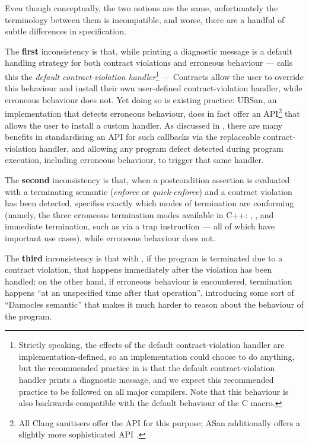Even though conceptually, the two notions are the same, unfortunately the terminology between them is incompatible, and worse, there are a handful of subtle differences in specification. 

The \textbf{first} inconsistency is that, while printing a diagnostic message is a default handling strategy for both contract violations and erroneous behaviour --- \cite{P2900R13} calls this the \emph{default contract-violation handler}\footnote{Strictly speaking, the effects of the default contract-violation handler are implementation-defined, so an implementation could choose to do anything, but the recommended practice in \cite{P2900R13} is that the default contract-violation handler prints a diagnostic message, and we expect this recommended practice to be followed on all major compilers. Note that this behaviour is also backwards-compatible with the default behaviour of the C  macro.}  --- Contracts allow the user to override this behaviour and install their own user-defined contract-violation handler, while erroneous behaviour does not. Yet doing so is existing practice: UBSan, an implementation that detects erroneous behaviour, does in fact offer an API\footnote{All Clang sanitisers offer the API  for this purpose; ASan additionally offers a slightly more sophisticated API .} that allows the user to install a custom handler. As discussed in \cite{P3100R1}, there are many benefits in standardising an API for such callbacks via the replaceable contract-violation handler, and allowing any program defect detected during program execution, including erroneous behaviour, to trigger that same handler.
 
The \textbf{second} inconsistency is that, when a \cite{P2900R13} postcondition assertion is evaluated with a terminating semantic (\emph{enforce} or \emph{quick-enforce}) and a contract violation has been detected, \cite{P2900R13} specifies exactly which modes of termination are conforming (namely, the three erroneous termination modes available in C++: , , and immediate termination, such as via a trap instruction --- all of which have important use cases), while erroneous behaviour does not.

The \textbf{third} inconsistency is that with \cite{P2900R13}, if the program is terminated due to a contract violation, that happens immediately after the violation has been handled; on the other hand, if erroneous behaviour is encountered, termination happens ``at an unspecified time after that operation'', introducing some sort of ``Damocles semantic'' that makes it much harder to reason about the behaviour of the program.

